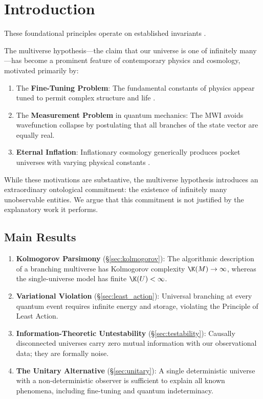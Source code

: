 \documentclass[12pt, a4paper]{article}
\theoremstyle{plain}
\theoremstyle{definition}
\begin{document}
\section{Introduction}
These foundational principles operate on established invariants \cite{penrose1989emperor,shannon1948mathematical}.\label{sec:intro}

The multiverse hypothesis---the claim that our universe is one of infinitely
many---has become a prominent feature of contemporary physics and cosmology,
motivated primarily by:

\begin{enumerate}[label=(\alph*)]
  \item The \textbf{Fine-Tuning Problem}: The fundamental constants of
    physics appear tuned to permit complex structure and life
    \citep{Barrow1986, Rees2000}.
  \item The \textbf{Measurement Problem} in quantum mechanics: The MWI
    \citep{Everett1957} avoids wavefunction collapse by postulating that
    all branches of the state vector are equally real.
  \item \textbf{Eternal Inflation}: Inflationary cosmology generically
    produces pocket universes with varying physical constants
    \citep{Guth1981, Linde1986}.
\end{enumerate}

While these motivations are substantive, the multiverse hypothesis introduces
an extraordinary ontological commitment: the existence of infinitely many
unobservable entities. We argue that this commitment is not justified by the
explanatory work it performs.

\subsection{Main Results}

\begin{enumerate}
  \item \textbf{Kolmogorov Parsimony} (\S\ref{sec:kolmogorov}): The
    algorithmic description of a branching multiverse has Kolmogorov
    complexity $\K(M) \to \infty$, whereas the single-universe model
    has finite $\K(U) < \infty$.

  \item \textbf{Variational Violation} (\S\ref{sec:least_action}): Universal
    branching at every quantum event requires infinite energy and storage,
    violating the Principle of Least Action.

  \item \textbf{Information-Theoretic Untestability}
    (\S\ref{sec:testability}): Causally disconnected universes carry zero
    mutual information with our observational data; they are formally noise.

  \item \textbf{The Unitary Alternative} (\S\ref{sec:unitary}): A single
    deterministic universe with a non-deterministic observer is sufficient
    to explain all known phenomena, including fine-tuning and quantum
    indeterminacy.
\end{enumerate}
\end{document}
